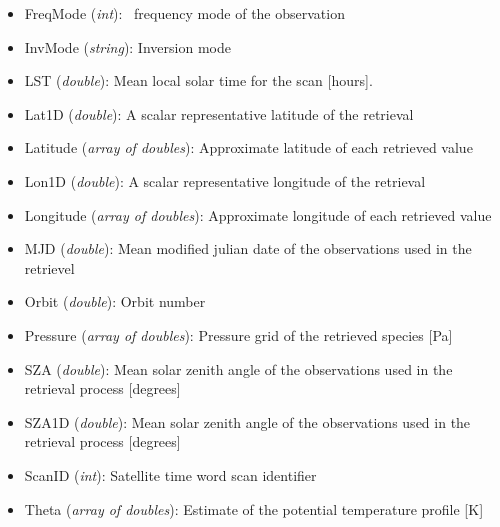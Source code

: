 \begin{itemize}

    \item FreqMode (\emph{int}): \smr\ frequency mode of the observation
    \item InvMode (\emph{string}): Inversion mode
    \item LST (\emph{double}): Mean local solar time for the scan [hours].
    \item Lat1D (\emph{double}): A scalar representative latitude of
      the retrieval
    \item Latitude (\emph{array of doubles}): Approximate latitude of each
      retrieved value
    \item Lon1D (\emph{double}): A scalar representative longitude of
      the retrieval
    \item Longitude (\emph{array of doubles}): Approximate longitude of each
      retrieved value
    \item MJD (\emph{double}): Mean modified julian date of the observations
      used in the retrievel
    \item Orbit (\emph{double}): Orbit number
    \item Pressure (\emph{array of doubles}): Pressure grid of the retrieved
      species [Pa]
    \item SZA  (\emph{double}): Mean solar zenith angle of the observations
      used in the retrieval process [degrees]
    \item SZA1D (\emph{double}): Mean solar zenith angle of the observations
      used in the retrieval process [degrees]
    \item ScanID (\emph{int}): Satellite time word scan identifier
    \item Theta (\emph{array of doubles}): Estimate of the potential temperature
      profile [K]

\end{itemize}
